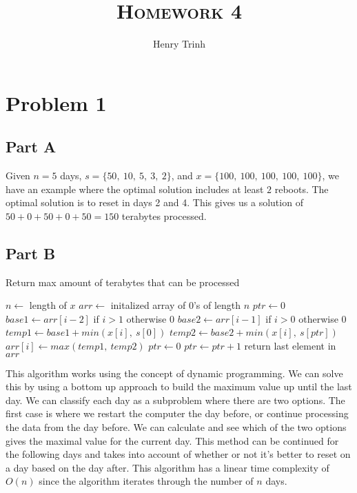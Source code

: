 \documentclass[12pt]{article}
\title{\textsc{Homework 4}}
\author{Henry Trinh}
\begin{document}
\maketitle

\newpage
\section*{Problem 1}
\subsection*{Part A}
Given $n=5$ days, $s=\{50,\ 10,\ 5,\ 3,\ 2\}$, and $x=\{100,\ 100,\ 100,\ 100,\ 100\}$,
we have an example where the optimal solution includes at least $2$ reboots. The optimal
solution is to reset in days 2 and 4. This gives us a solution of $50 + 0 + 50 + 0 + 50 = 150$
terabytes processed.

\subsection*{Part B}
\begin{algorithm}
\caption{Return max amount of terabytes that can be processed}
\begin{algorithmic}[1]
    \State $n \gets $ length of $x$
    \State $arr \gets $ initalized array of $0$'s of length $n$
    \State $ptr \gets 0$
        \State $base1 \gets arr[i - 2]$ if $i > 1$ otherwise $0$
        \State $base2 \gets arr[i - 1]$ if $i > 0$ otherwise $0$
        \State
        \State $temp1 \gets base1 + min(x[i],\ s[0])$
        \State $temp2 \gets base2 + min(x[i],\ s[ptr])$ 
        \State
        \State $arr[i] \gets max(temp1,\ temp2)$
            \State $ptr \gets 0$
        \EndIf
        \State $ptr \gets ptr + 1$
    \EndFor
    \State return last element in $arr$
\EndFunction
\end{algorithmic}
\end{algorithm}
This algorithm works using the concept of dynamic programming. We can solve this by using a bottom
up approach to build the maximum value up until the last day. We can classify each day as a subproblem
where there are two options. The first case is where we restart the computer the day before, or continue
processing the data from the day before. We can calculate and see which of the two options gives the maximal 
value for the current day. This method can be continued for the following days and takes into account of 
whether or not it's better to reset on a day based on the day after.
\newline
\newline
This algorithm has a linear time complexity of $O(n)$ since the algorithm iterates through the number of $n$ days.
\end{document}
